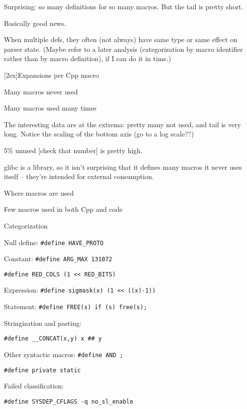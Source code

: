 \documentclass{slides}
\def\slidetitle#1{\begin{center}\large #1 \end{center}}
\def\raisedslidetitle#1{\centerline{\raisebox{1.5in}[2ex]{\large #1}}}
\def\slbreak{\\ \strut\hspace{1em}}
\begin{document}
\begin{note}
Surprising: so many definitions for so many macros.  But the tail is pretty
short.

Basically good news.

When multiple defs, they often (not always) have same type or same effect
on parser state.  (Maybe refer to a later analysis (categorization by macro
identifier rather than by macro definition), if I can do it in time.)
\end{note}

\begin{slide}
\raisedslidetitle{Expansions per Cpp macro}

\centerline{}

Many macros never used \slbreak
Many macros used many times
\end{slide}

\begin{note}
The interesting data are at the extrema:  pretty many not used, and tail is
very long.  Notice the scaling of the bottom axis (go to a log scale??)

5\% unused [check that number] is pretty high.

glibc is a library, so it isn't surprising that it defines many macros it
never uses itself -- they're intended for external consumption.
\end{note}

\begin{slide}
\slidetitle{Where macros are used}

\centerline{}

Few macros used in both Cpp and code
\end{slide}

\begin{note}
\end{note}

\begin{slide}
\slidetitle{Categorization}

Null define: {\tt \#define \verb|HAVE_PROTO|}

Constant: {\tt \#define \verb|ARG_MAX| 131072} \slbreak
{\tt \#define \verb|RED_COLS| (1 << \verb|RED_BITS|)}

Expression: {\tt \#define sigmask(x) (1 << ((x)-1))}

Statement: {\tt \#define FREE(s) if (s) free(s);}

Stringization and pasting: \slbreak
  {\tt \#define \verb|__CONCAT|(x,y) x \#\# y}

Other syntactic macros: {\tt \#define AND ;} \slbreak
  {\tt \#define private static}

Failed classification: \slbreak
  {\tt \#define \verb|SYSDEP_CFLAGS| -q \verb|no_sl_enable|}
\end{slide}
\end{document}
